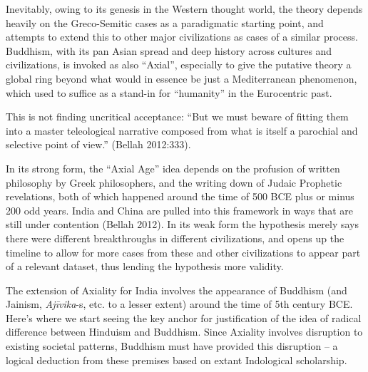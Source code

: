 Inevitably, owing to its genesis in the Western thought world, the theory depends heavily on the Greco-Semitic cases as a paradigmatic starting point, and attempts to extend this to other major civilizations as cases of a similar process. Buddhism, with its pan Asian spread and deep history across cultures and civilizations, is invoked as also “Axial”, especially to give the putative theory a global ring beyond what would in essence be just a Mediterranean phenomenon, which used to suffice as a stand-in for “humanity” in the Eurocentric past.

This is not finding uncritical acceptance: “But we must beware of fitting them into a master teleological narrative composed from what is itself a parochial and selective point of view.” (Bellah 2012:333).

In its strong form, the “Axial Age” idea depends on the profusion of written philosophy by Greek philosophers, and the writing down of Judaic Prophetic revelations, both of which happened around the time of 500 BCE plus or minus 200 odd years. India and China are pulled into this framework in ways that are still under contention (Bellah 2012). In its weak form the hypothesis merely says there were different breakthroughs in different civilizations, and opens up the timeline to allow for more cases from these and other civilizations to appear part of a relevant dataset, thus lending the hypothesis more validity.

The extension of Axiality for India involves the appearance of Buddhism (and Jainism, \textit{Ajīvika}-s, etc. to a lesser extent) around the time of 5th century BCE. Here’s where we start seeing the key anchor for justification of the idea of radical difference between Hinduism and Buddhism. Since Axiality involves disruption to existing societal patterns, Buddhism must have provided this disruption – a logical deduction from these premises based on extant Indological scholarship.

